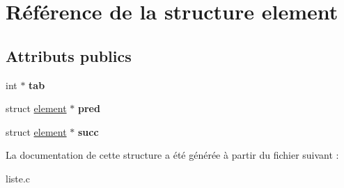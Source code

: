 \hypertarget{structelement}{}\section{Référence de la structure element}
\label{structelement}
\subsection*{Attributs publics}
\begin{DoxyCompactItemize}
\item 
\mbox{\label{structelement_afbfe1f48db349ffa752ed01823ceb382}} 
int $\ast$ {\bfseries tab}
\item 
\mbox{\label{structelement_a9f9ebee1fa1dce6d05bc325a66478635}} 
struct \mbox{\hyperlink{structelement}{element}} $\ast$ {\bfseries pred}
\item 
\mbox{\label{structelement_abe10f441a14a96bd130a004585b475ad}} 
struct \mbox{\hyperlink{structelement}{element}} $\ast$ {\bfseries succ}
\end{DoxyCompactItemize}


La documentation de cette structure a été générée à partir du fichier suivant \+:\begin{DoxyCompactItemize}
\item 
liste.\+c\end{DoxyCompactItemize}
